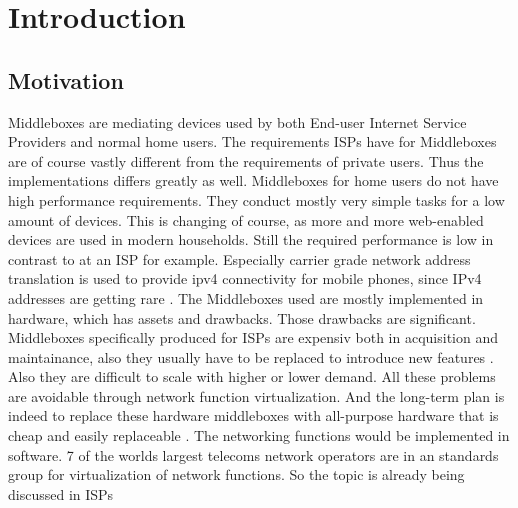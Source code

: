 \documentclass[11pt,a4paper,twoside,openright,bachelor,english]{netthesis}
\author{Simon Sternsdorf}
\begin{document}
%


\maketitle%





%

{\tableofcontents}
{\listoffigures}
{\listoftables}

\cleardoublepage


\chapter{Introduction}

\section{Motivation}
Middleboxes are mediating devices used by both End-user Internet Service Providers and normal home users. The requirements ISPs have for Middleboxes are of course vastly different from the requirements of private users. Thus the implementations differs greatly as well. Middleboxes for home users do not have high performance requirements. They conduct mostly very simple tasks for a low amount of devices. This is changing of course, as more and more web-enabled devices are used in modern households. 
Still the required performance is low in contrast to at an ISP for example. Especially carrier grade network address translation is used to provide ipv4 connectivity for mobile phones, since IPv4 addresses are getting rare \cite{A10}. The Middleboxes used are mostly implemented in hardware, which has assets and drawbacks. Those drawbacks are significant. 
Middleboxes specifically produced for ISPs are expensiv both in acquisition and maintainance, also they usually have to be replaced to introduce new features \cite{WhiteP}. Also they are difficult to scale with higher or lower demand. All these problems are avoidable through network function virtualization. And the long-term plan is indeed to replace these hardware middleboxes with all-purpose hardware that is cheap and easily replaceable \cite{Click}. The networking functions would be implemented in software. 7 of the worlds largest telecoms network operators are in an standards group for virtualization of network functions. So the topic is already being discussed in ISPs \cite{NetDis} 
\end{document}
